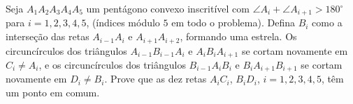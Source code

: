 Seja $A_1A_2A_3A_4A_5$ um pentágono convexo inscritível com $\angle A_i + \angle A_{i+1} > 180^\circ$ para $i = 1, 2, 3, 4, 5$, (índices módulo $5$ em todo o problema).
Defina $B_i$ como a interseção das retas $A_{i-1}A_i$ e $A_{i+1}A_{i+2}$, formando uma estrela.
Os circuncírculos dos triângulos $A_{i-1}B_{i-1}A_i$ e $A_iB_iA_{i+1}$ se cortam novamente em $C_i \neq A_i$, e os circuncírculos dos triângulos $B_{i-1}A_iB_i$ e $B_iA_{i+1}B_{i+1}$ se cortam novamente em $D_i \neq B_i$.
Prove que as dez retas $A_iC_i$, $B_iD_i$, $i = 1, 2, 3, 4, 5$, têm um ponto em comum.
